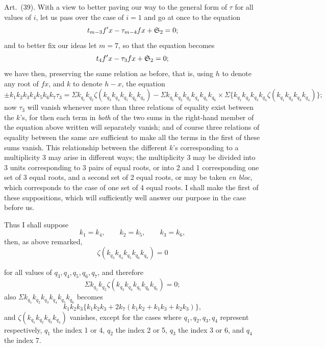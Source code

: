 \documentclass[11pt]{article}
\newcommand{\sourcepage}[1]{\marginpar{\scriptsize p.~#1}}
\newcommand{\art}[1]{\par\smallskip\noindent Art.~(#1).\quad}
\begin{document}
\art{39} With a view to better paving our way to the general form of $\tau$ for all values of $i$, let us pass over the case of $i=1$ and go at once to the equation
\[
t_{m-3}f'x-\tau_{m-4}fx+\mathfrak{S}_2=0;
\]
and to better fix our ideas let $m=7$, so that the equation becomes
\[
t_4f'x-\tau_3fx+\mathfrak{S}_2=0;
\]
we have then, preserving the same relation as before, that is, using $h$ to denote any root of $fx$, and $k$ to denote $h-x$, the equation
\[
\pm k_1k_2k_3k_4k_5k_6k_7\tau_3
=\Sigma k_{q_1}k_{q_2}\zeta(k_{q_3}k_{q_4}k_{q_5}k_{q_6}k_{q_7})
-\Sigma k_{q_1}k_{q_2}k_{q_3}k_{q_4}k_{q_5}k_{q_6}\times
\Sigma\{k_{q_1}k_{q_2}k_{q_3}k_{q_4}\zeta(k_{q_1}k_{q_2}k_{q_3}k_{q_4})\};
\]
now $\tau_3$ will vanish whenever more than three relations of equality exist between the $k$'s, for then each term in \emph{both} of the two sums in the right-hand member of the equation above written will separately vanish; and of course three relations of equality between the same are sufficient to make all the terms in the first of these sums vanish. This relationship between the different $k$'s corresponding to a multiplicity 3 may arise in different ways; the multiplicity 3 may be divided into 3 units corresponding to 3 pairs of equal roots, or into 2 and 1 corresponding one set of 3 equal roots, and a second set of 2 equal roots, or may be taken \emph{en bloc}, which corresponds to the case of one set of 4 equal roots. I shall make the first of these suppositions, which will sufficiently well answer our purpose in the case before us.

Thus I shall suppose
\[
k_1=k_4,\qquad k_2=k_5,\qquad k_3=k_6,
\]
then, as above remarked,
\[
\zeta(k_{q_3}k_{q_4}k_{q_5}k_{q_6}k_{q_7})=0
\]

\sourcepage{490}
for all values of $q_3,q_4,q_5,q_6,q_7$, and therefore
\[
\Sigma k_{q_1}k_{q_2}\zeta(k_{q_3}k_{q_4}k_{q_5}k_{q_6}k_{q_7})=0;
\]
also $\Sigma k_{q_1}k_{q_2}k_{q_3}k_{q_4}k_{q_5}k_{q_6}$ becomes
\[
k_1k_2k_3\{k_1k_2k_3+2k_7(k_1k_2+k_1k_3+k_2k_3)\},
\]
and $\zeta(k_{q_1}k_{q_2}k_{q_3}k_{q_4})$ vanishes, except for the cases where $q_1,q_2,q_3,q_4$ represent respectively, $q_1$ the index 1 or 4, $q_2$ the index 2 or 5, $q_3$ the index 3 or 6, and $q_4$ the index 7.
\end{document}

